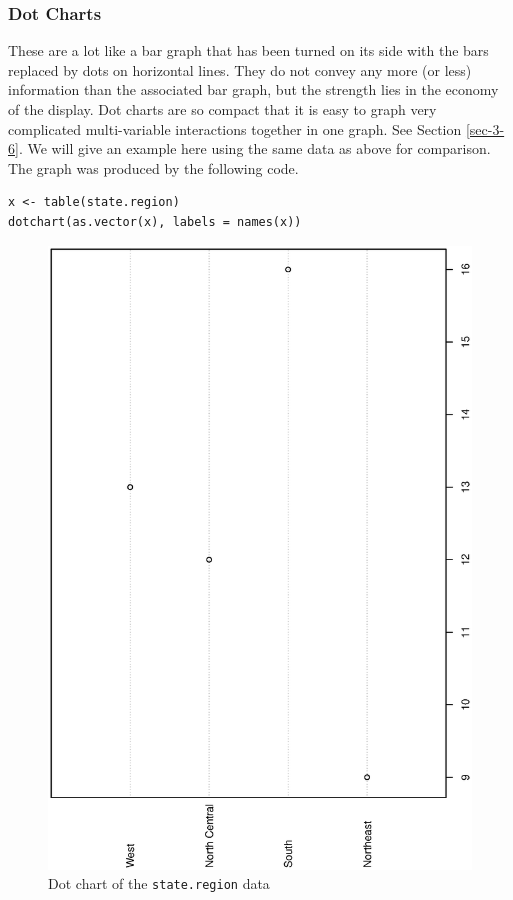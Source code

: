 \documentclass[captions=tableheading]{scrbook}
\begin{document}
\subsubsection{Dot Charts}
\label{sec-3-1-4-4}
\label{par:Dotcharts}


These are a lot like a bar graph that has been turned on its side with the bars replaced by dots on horizontal lines. They do not convey any more (or less) information than the associated bar graph, but the strength lies in the economy of the display. Dot charts are so compact that it is easy to graph very complicated multi-variable interactions together in one graph. See Section \ref{sec-3-6}. We will give an example here using the same data as above for comparison. The graph was produced by the following code.

\begin{example}


\lstset{language=R}
\begin{lstlisting}
x <- table(state.region)
dotchart(as.vector(x), labels = names(x))
\end{lstlisting}





\begin{figure}[th]
  \includegraphics[angle=270, totalheight=4in]{ps/datadesc/dot-charts.ps}
  \caption{Dot chart of the \texttt{state.region} data}
  \label{fig-dot-charts}
\end{figure}



\end{example}
\end{document}
